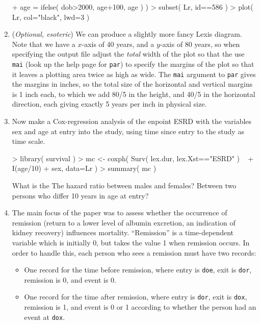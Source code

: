 \begin{enumerate}
\begin{Schunk}
\begin{Sinput}
+                      age = ifelse( dob>2000, age+100, age ) )
> subset( Lr, id==586 )
> plot( Lr, col="black", lwd=3 )
\end{Sinput}
\end{Schunk}
\item (\emph{Optional, esoteric}) We can produce a slightly more
  fancy Lexis diagram. Note that we have a $x$-axis of 40 years, and
  a $y$-axis of 80 years, so when specifying the output file adjust
  the \emph{total} width of the plot so that the use \texttt{mai}
  (look up the help page for \texttt{par}) to specify the margins of
  the plot so that it leaves a plotting area twice as high as wide. The
  \texttt{mai} argument to \texttt{par} gives the margins in inches,
  so the total size of the horizontal and vertical margins is 1
  inch each, to which we add 80/5 in the height, and 40/5 in the
  horizontal direction, each giving exactly 5 years per inch in
  physical size.
\item Now make a Cox-regression analysis of the enpoint ESRD with
  the variables sex and age at entry into the study, using time
  since entry to the study as time scale.
\begin{Schunk}
\begin{Sinput}
> library( survival )
> mc <- coxph( Surv( lex.dur, lex.Xst=="ESRD" ) ~
+              I(age/10) + sex, data=Lr )
> summary( mc )
\end{Sinput}
\end{Schunk}
  What is the The hazard ratio between males and females?
%
  Between two persons who differ 10 years in age at entry?
\item The main focus of the paper was to assess whether the occurrence of
  remission (return to a lower level of albumin excretion, an
  indication of kidney recovery) influences mortality.
  ``Remission'' is a time-dependent variable which is initially 0, but
  takes the value 1 when remission occurs. In order to handle this, each
  person who sees a remission must have two records:
  \begin{itemize}
  \item One record for the time before remission, where entry is
    \texttt{doe}, exit is \texttt{dor}, remission is 0, and event is
    0.
  \item One record for the time after remission, where entry is
    \texttt{dor}, exit is \texttt{dox}, remission is 1, and event is 0
    or 1 according to whether the person had an event at \texttt{dox}.
  \end{itemize}

\end{enumerate}
